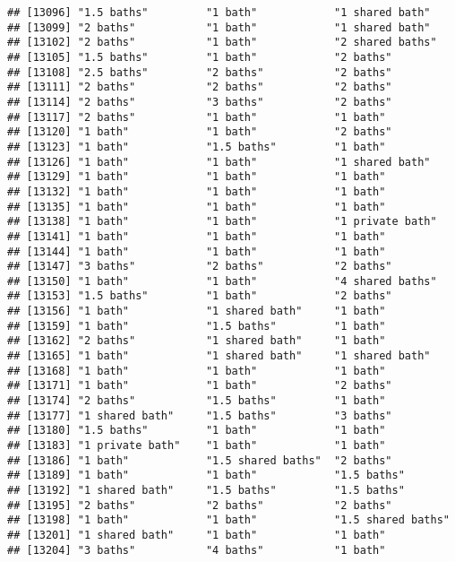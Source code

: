 \documentclass[
]{article}
\begin{document}
\begin{verbatim}
## [13096] "1.5 baths"         "1 bath"            "1 shared bath"    
## [13099] "2 baths"           "1 bath"            "1 shared bath"    
## [13102] "2 baths"           "1 bath"            "2 shared baths"   
## [13105] "1.5 baths"         "1 bath"            "2 baths"          
## [13108] "2.5 baths"         "2 baths"           "2 baths"          
## [13111] "2 baths"           "2 baths"           "2 baths"          
## [13114] "2 baths"           "3 baths"           "2 baths"          
## [13117] "2 baths"           "1 bath"            "1 bath"           
## [13120] "1 bath"            "1 bath"            "2 baths"          
## [13123] "1 bath"            "1.5 baths"         "1 bath"           
## [13126] "1 bath"            "1 bath"            "1 shared bath"    
## [13129] "1 bath"            "1 bath"            "1 bath"           
## [13132] "1 bath"            "1 bath"            "1 bath"           
## [13135] "1 bath"            "1 bath"            "1 bath"           
## [13138] "1 bath"            "1 bath"            "1 private bath"   
## [13141] "1 bath"            "1 bath"            "1 bath"           
## [13144] "1 bath"            "1 bath"            "1 bath"           
## [13147] "3 baths"           "2 baths"           "2 baths"          
## [13150] "1 bath"            "1 bath"            "4 shared baths"   
## [13153] "1.5 baths"         "1 bath"            "2 baths"          
## [13156] "1 bath"            "1 shared bath"     "1 bath"           
## [13159] "1 bath"            "1.5 baths"         "1 bath"           
## [13162] "2 baths"           "1 shared bath"     "1 bath"           
## [13165] "1 bath"            "1 shared bath"     "1 shared bath"    
## [13168] "1 bath"            "1 bath"            "1 bath"           
## [13171] "1 bath"            "1 bath"            "2 baths"          
## [13174] "2 baths"           "1.5 baths"         "1 bath"           
## [13177] "1 shared bath"     "1.5 baths"         "3 baths"          
## [13180] "1.5 baths"         "1 bath"            "1 bath"           
## [13183] "1 private bath"    "1 bath"            "1 bath"           
## [13186] "1 bath"            "1.5 shared baths"  "2 baths"          
## [13189] "1 bath"            "1 bath"            "1.5 baths"        
## [13192] "1 shared bath"     "1.5 baths"         "1.5 baths"        
## [13195] "2 baths"           "2 baths"           "2 baths"          
## [13198] "1 bath"            "1 bath"            "1.5 shared baths" 
## [13201] "1 shared bath"     "1 bath"            "1 bath"           
## [13204] "3 baths"           "4 baths"           "1 bath"           

\end{verbatim}
\end{document}
